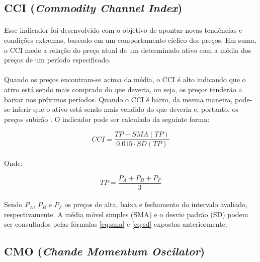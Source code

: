 \documentclass[grad,numbers]{coppe}
\begin{document}
        \subsection{CCI (\textit{Commodity Channel Index})}
            \paragraph{}Esse indicador foi desenvolvido com o objetivo de apontar novas tendências e condições extremas, baseado em um comportamento cíclico dos preços. Em suma, o CCI mede a relação do preço atual de um determinado ativo com a média dos preços de um período especificado.
            
            \paragraph{}Quando os preços encontram-se acima da média, o CCI é alto indicando que o ativo está sendo mais comprado do que deveria, ou seja, os preços tenderão a baixar nos próximos períodos. Quando o CCI é baixo, da mesma maneira, pode-se inferir que o ativo está sendo mais vendido do que deveria e, portanto, os preços subirão \cite{cci-indicator}. O indicador pode ser calculado da seguinte forma:
            
            \begin{equation}
                CCI = \frac{TP - SMA(TP)}{0.015 \cdot SD(TP)} 
            \end{equation}
            
            \paragraph{}Onde:
            
            \begin{equation}
                 TP = \frac{P_A + P_B + P_F}{3}
            \end{equation}
               
                
            \paragraph{}Sendo $P_A$, $P_B$ e  $P_F$ os preços de alta, baixa e fechamento do intervalo avaliado, respectivamente. A média móvel simples (SMA) e o desvio padrão (SD) podem ser consultados pelas fórmulas \ref{eq:sma} e \ref{eq:sd} expostas anteriormente.
            
        \subsection{CMO (\textit{Chande Momentum Oscilator})}
        
\end{document}
